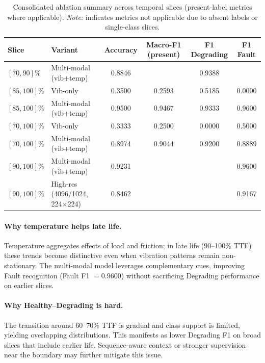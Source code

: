\documentclass[pdflatex,sn-mathphys-num]{sn-jnl}%
\begin{document}
\begin{table}[t]
  \caption{Consolidated ablation summary across temporal slices (present-label metrics where applicable). \emph{Note:} \textemdash{} indicates metrics not applicable due to absent labels or single-class slices.}
  \label{tab:abl_summary}
  \centering
  \begin{tabular}{l l c c c c}
    \toprule
    Slice & Variant & Accuracy & Macro-F1 (present) & F1 Degrading & F1 Fault \\
    \midrule
    $[70,90]\%$ & Multi-modal (vib+temp) & 0.8846 & \textemdash{} & 0.9388 & \textemdash{} \\
    $[85,100]\%$ & Vib-only & 0.3500 & 0.2593 & 0.5185 & 0.0000 \\
    $[85,100]\%$ & Multi-modal (vib+temp) & 0.9500 & 0.9467 & 0.9333 & 0.9600 \\
    \midrule
    $[70,100]\%$ & Vib-only & 0.3333 & 0.2500 & 0.0000 & 0.5000 \\
    $[70,100]\%$ & Multi-modal (vib+temp) & 0.8974 & 0.9044 & 0.9200 & 0.8889 \\
    \midrule
    $[90,100]\%$ & Multi-modal (vib+temp) & 0.9231 & \textemdash{} & \textemdash{} & 0.9600 \\
    $[90,100]\%$ & High-res (4096/1024, 224$\times$224) & 0.8462 & \textemdash{} & \textemdash{} & 0.9167 \\
    \bottomrule
  \end{tabular}
\end{table}
\FloatBarrier

\paragraph{Why temperature helps late life.}
Temperature aggregates effects of load and friction; in late life (90--100\% TTF) these trends become distinctive even when vibration patterns remain non-stationary. The multi-modal model leverages complementary cues, improving Fault recognition (Fault F1 $=0.9600$) without sacrificing Degrading performance on earlier slices.

\paragraph{Why Healthy--Degrading is hard.}
The transition around 60--70\% TTF is gradual and class support is limited, yielding overlapping distributions. This manifests as lower Degrading F1 on broad slices that include earlier life. Sequence-aware context or stronger supervision near the boundary may further mitigate this issue.
\end{document}
